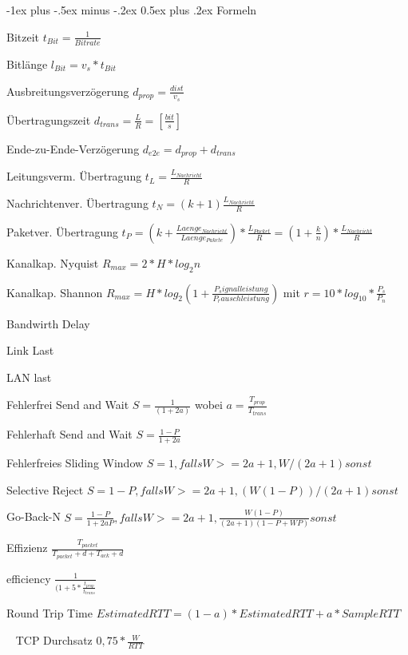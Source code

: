 \documentclass[10pt,landscape]{article}
\makeatletter
\renewcommand{\section}{\@startsection{section}{1}{0mm}%
                                {-1ex plus -.5ex minus -.2ex}%
                                {0.5ex plus .2ex}%
                                {\normalfont\large\bfseries}}
\makeatother
\begin{document}
\begin{multicols}{3}
\end{multicols}


\section{Formeln}
\begin{multicols}{2}
    Bitzeit  $t_{Bit}=\frac{1}{Bitrate}$
    
    Bitlänge  $l_{Bit}=v_s * t_{Bit}$
    
    Ausbreitungsverzögerung   $d_{prop} = \frac{dist}{v_s}$
    
    Übertragungszeit  $d_{trans} = \frac{L}{R} = [\frac{bit}{s}]$
    
    Ende-zu-Ende-Verzögerung  $d_{e2e} = d_{prop} + d_{trans}$
    
    Leitungsverm. Übertragung  $t_L = \frac{L_{Nachricht}}{R}$
    
    Nachrichtenver. Übertragung  $t_N = (k + 1)\frac{L_{Nachricht}}{R}$
    
    Paketver. Übertragung  $t_{P} = (k + \frac{Laenge_{Nachricht}}{Laenge_{Pakete}})*\frac{L_{Packet}}{R} = (1+ \frac{k}{n})* \frac{L_{Nachricht}}{R}$
    
    Kanalkap. Nyquist  $R_{max} = 2* H * log_2n$
    
    Kanalkap. Shannon  $R_{max} = H* log_2(1+\frac{P_signalleistung}{P_rauschleistung})$ mit $r=10*log_{10}*{\frac{P_s}{P_n}}$
    
    Bandwirth Delay 
    
    Link Last 
    
    LAN last 
    
    Fehlerfrei Send and Wait  $S = \frac{1}{(1+2a)}$ wobei $a = \frac{T_{prop}}{T_{trans}}$
    
    Fehlerhaft Send and Wait  $S = \frac{1-P}{1+2a}$
    
    Fehlerfreies Sliding Window  $S = {1, falls W >= 2a+1, W/(2a+1) sonst}$
    
    Selective Reject  $S = {1-P, falls W >= 2a+1, (W(1-P))/(2a+1) sonst}$
    
    Go-Back-N  $S = {\frac{1-P}{1+2aP}, falls W >= 2a+1, \frac{W(1-P)}{(2a+1)(1-P+WP)} sonst}$
    
    Effizienz  $\frac{T_{packet} }{ T_{packet} + d + T_{ack} + d}$
    
    efficiency  $\frac{1}{ (1+ 5 * \frac{t_{prop}}{t_{trans}}}$
    
    Round Trip Time  $EstimatedRTT = (1-a) * EstimatedRTT + a * SampleRTT$
    
    ~ TCP Durchsatz  $ 0,75 * \frac{W}{RTT}$
    
    
\end{multicols}
\newpage
\end{document}
